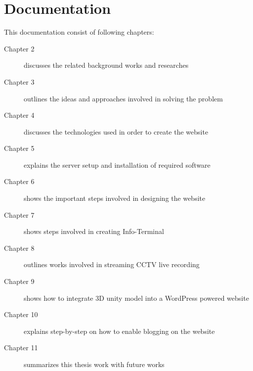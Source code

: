 \section{Documentation}
This documentation consist of following chapters:
\begin{description}
\item[Chapter 2] discusses the related background works and researches
\item[Chapter 3] outlines the ideas and approaches involved in solving the problem
\item[Chapter 4] discusses the technologies used in order to create the website
\item[Chapter 5] explains the server setup and installation of required software
\item[Chapter 6] shows the important steps involved in designing the website
\item[Chapter 7] shows steps involved in creating Info-Terminal
\item[Chapter 8] outlines works involved in streaming CCTV live recording
\item[Chapter 9] shows how to integrate 3D unity model into a WordPress powered website
\item[Chapter 10] explains step-by-step on how to enable blogging on the website
\item[Chapter 11] summarizes this thesis work with future works
\end{description}